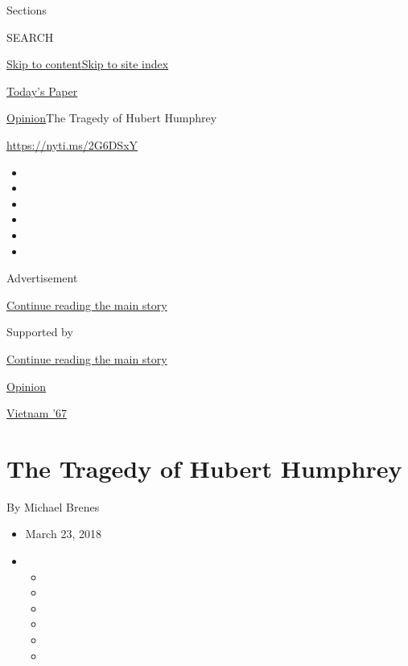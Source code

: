 Sections

SEARCH

\protect\hyperlink{site-content}{Skip to
content}\protect\hyperlink{site-index}{Skip to site index}

\href{https://myaccount.nytimes.com/auth/login?response_type=cookie\&client_id=vi}{}

\href{https://www.nytimes.com/section/todayspaper}{Today's Paper}

\href{/section/opinion}{Opinion}\textbar{}The Tragedy of Hubert Humphrey

\href{https://nyti.ms/2G6DSxY}{https://nyti.ms/2G6DSxY}

\begin{itemize}
\item
\item
\item
\item
\item
\item
\end{itemize}

Advertisement

\protect\hyperlink{after-top}{Continue reading the main story}

Supported by

\protect\hyperlink{after-sponsor}{Continue reading the main story}

\href{/section/opinion}{Opinion}

\href{/column/vietnam-67}{Vietnam '67}

\hypertarget{the-tragedy-of-hubert-humphrey}{%
\section{The Tragedy of Hubert
Humphrey}\label{the-tragedy-of-hubert-humphrey}}

By Michael Brenes

\begin{itemize}
\item
  March 23, 2018
\item
  \begin{itemize}
  \item
  \item
  \item
  \item
  \item
  \item
  \end{itemize}
\end{itemize}

